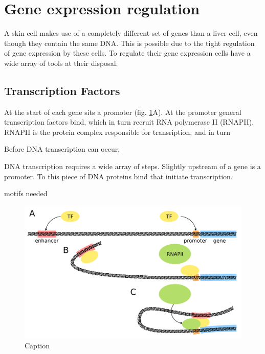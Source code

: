 
\section{Gene expression regulation}

A skin cell makes use of a completely different set of genes than a liver cell, even though they contain the same DNA. This is possible due to the tight regulation of gene expression by these cells. To regulate their gene expression cells have a wide array of tools at their disposal. 

\subsection{Transcription Factors}

At the start of each gene sits a promoter (fig. \ref{fig:TF}A). At the promoter general transcription factors bind, which in turn recruit RNA polymerase II (RNAPII). RNAPII is the protein complex responsible for transription, and in turn 

Before DNA transcription can occur, 

DNA transcription requires a wide array of steps. Slightly upstream of a gene is a promoter. To this piece of DNA proteins bind that initiate transcription.

motifs needed

\begin{figure}[H]
    \includegraphics[width=\linewidth]{ch1.Introduction/imgs/transcription_factor.png}
    \caption{Caption}
    \label{fig:TF}
\end{figure}

